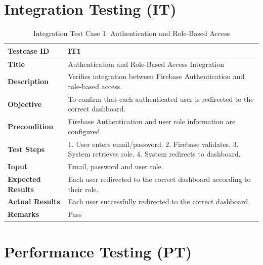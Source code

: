 \documentclass[12pt, a4paper, oneside]{report}
\begin{document}
\section{Integration Testing (IT)}

\begin{table}[H]
\centering
\caption{Integration Test Case 1: Authentication and Role-Based Access}
\begin{tabularx}{\textwidth}{|l|X|}
\hline
\textbf{Testcase ID} & IT1 \\ \hline
\textbf{Title} & Authentication and Role-Based Access Integration \\ \hline
\textbf{Description} & Verifies integration between Firebase Authentication and role-based access. \\ \hline
\textbf{Objective} & To confirm that each authenticated user is redirected to the correct dashboard. \\ \hline
\textbf{Precondition} & Firebase Authentication and user role information are configured. \\ \hline
\textbf{Test Steps} & 1. User enters email/password. 2. Firebase validates. 3. System retrieves role. 4. System redirects to dashboard. \\ \hline
\textbf{Input} & Email, password and user role. \\ \hline
\textbf{Expected Results} & Each user redirected to the correct dashboard according to their role. \\ \hline
\textbf{Actual Results} & Each user successfully redirected to the correct dashboard. \\ \hline
\textbf{Remarks} & Pass \\ \hline
\end{tabularx}
\end{table}



\section{Performance Testing (PT)}
\end{document}
